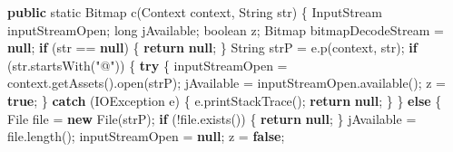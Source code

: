 \documentclass[
]{article}
\newenvironment{Shaded}{}{}
\newcommand{\BuiltInTok}[1]{\textcolor[rgb]{0.00,0.50,0.00}{#1}}
\newcommand{\ControlFlowTok}[1]{\textcolor[rgb]{0.00,0.44,0.13}{\textbf{#1}}}
\newcommand{\DataTypeTok}[1]{\textcolor[rgb]{0.56,0.13,0.00}{#1}}
\newcommand{\FunctionTok}[1]{\textcolor[rgb]{0.02,0.16,0.49}{#1}}
\newcommand{\KeywordTok}[1]{\textcolor[rgb]{0.00,0.44,0.13}{\textbf{#1}}}
\newcommand{\NormalTok}[1]{#1}
\newcommand{\OperatorTok}[1]{\textcolor[rgb]{0.40,0.40,0.40}{#1}}
\newcommand{\StringTok}[1]{\textcolor[rgb]{0.25,0.44,0.63}{#1}}
\begin{document}
\begin{Shaded}
\begin{Highlighting}[]
    \KeywordTok{public} \DataTypeTok{static}\NormalTok{ Bitmap }\FunctionTok{c}\OperatorTok{(}\BuiltInTok{Context}\NormalTok{ context}\OperatorTok{,} \BuiltInTok{String}\NormalTok{ str}\OperatorTok{)} \OperatorTok{\{}
        \BuiltInTok{InputStream}\NormalTok{ inputStreamOpen}\OperatorTok{;}
        \DataTypeTok{long}\NormalTok{ jAvailable}\OperatorTok{;}
        \DataTypeTok{boolean}\NormalTok{ z}\OperatorTok{;}
\NormalTok{        Bitmap bitmapDecodeStream }\OperatorTok{=} \KeywordTok{null}\OperatorTok{;}
        \ControlFlowTok{if} \OperatorTok{(}\NormalTok{str }\OperatorTok{==} \KeywordTok{null}\OperatorTok{)} \OperatorTok{\{}
            \ControlFlowTok{return} \KeywordTok{null}\OperatorTok{;}
        \OperatorTok{\}}
        \BuiltInTok{String}\NormalTok{ strP }\OperatorTok{=}\NormalTok{ e}\OperatorTok{.}\FunctionTok{p}\OperatorTok{(}\NormalTok{context}\OperatorTok{,}\NormalTok{ str}\OperatorTok{);}
        \ControlFlowTok{if} \OperatorTok{(}\NormalTok{str}\OperatorTok{.}\FunctionTok{startsWith}\OperatorTok{(}\StringTok{"@"}\OperatorTok{))} \OperatorTok{\{}
            \ControlFlowTok{try} \OperatorTok{\{}
\NormalTok{                inputStreamOpen }\OperatorTok{=}\NormalTok{ context}\OperatorTok{.}\FunctionTok{getAssets}\OperatorTok{().}\FunctionTok{open}\OperatorTok{(}\NormalTok{strP}\OperatorTok{);}
\NormalTok{                jAvailable }\OperatorTok{=}\NormalTok{ inputStreamOpen}\OperatorTok{.}\FunctionTok{available}\OperatorTok{();}
\NormalTok{                z }\OperatorTok{=} \KeywordTok{true}\OperatorTok{;}
            \OperatorTok{\}} \ControlFlowTok{catch} \OperatorTok{(}\BuiltInTok{IOException}\NormalTok{ e}\OperatorTok{)} \OperatorTok{\{}
\NormalTok{                e}\OperatorTok{.}\FunctionTok{printStackTrace}\OperatorTok{();}
                \ControlFlowTok{return} \KeywordTok{null}\OperatorTok{;}
            \OperatorTok{\}}
        \OperatorTok{\}} \ControlFlowTok{else} \OperatorTok{\{}
            \BuiltInTok{File}\NormalTok{ file }\OperatorTok{=} \KeywordTok{new} \BuiltInTok{File}\OperatorTok{(}\NormalTok{strP}\OperatorTok{);}
            \ControlFlowTok{if} \OperatorTok{(!}\NormalTok{file}\OperatorTok{.}\FunctionTok{exists}\OperatorTok{())} \OperatorTok{\{}
                \ControlFlowTok{return} \KeywordTok{null}\OperatorTok{;}
            \OperatorTok{\}}
\NormalTok{            jAvailable }\OperatorTok{=}\NormalTok{ file}\OperatorTok{.}\FunctionTok{length}\OperatorTok{();}
\NormalTok{            inputStreamOpen }\OperatorTok{=} \KeywordTok{null}\OperatorTok{;}
\NormalTok{            z }\OperatorTok{=} \KeywordTok{false}\OperatorTok{;}

\end{Highlighting}
\end{Shaded}
\end{document}
